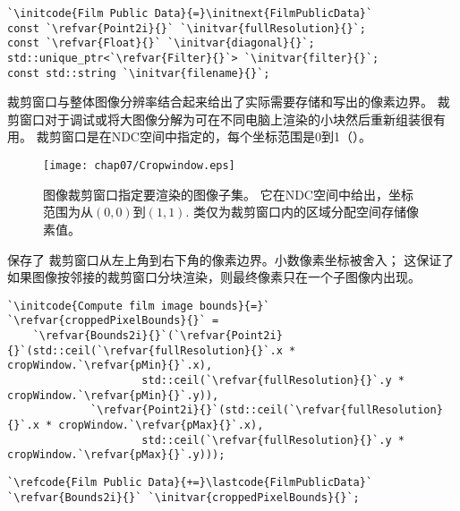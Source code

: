 \begin{lstlisting}
`\initcode{Film Public Data}{=}\initnext{FilmPublicData}`
const `\refvar{Point2i}{}` `\initvar{fullResolution}{}`;
const `\refvar{Float}{}` `\initvar{diagonal}{}`;
std::unique_ptr<`\refvar{Filter}{}`> `\initvar{filter}{}`;
const std::string `\initvar{filename}{}`;
\end{lstlisting}

裁剪窗口与整体图像分辨率结合起来给出了实际需要存储和写出的像素边界。
裁剪窗口对于调试或将大图像分解为可在不同电脑上渲染的小块然后重新组装很有用。
裁剪窗口是在NDC空间中指定的，每个坐标范围是0到1（）。
\begin{figure}[htbp]
    \centering\texttt{[image: chap07/Cropwindow.eps]}
    \caption{图像裁剪窗口指定要渲染的图像子集。
    它在NDC空间中给出，坐标范围为从$(0,0)$到$(1,1)$.
    类仅为裁剪窗口内的区域分配空间存储像素值。}
    \label{fig:7.47}
\end{figure}

保存了
裁剪窗口从左上角到右下角的像素边界。小数像素坐标被舍入；
这保证了如果图像按邻接的裁剪窗口分块渲染，则最终像素只在一个子图像内出现。
\begin{lstlisting}
`\initcode{Compute film image bounds}{=}`
`\refvar{croppedPixelBounds}{}` =
    `\refvar{Bounds2i}{}`(`\refvar{Point2i}{}`(std::ceil(`\refvar{fullResolution}{}`.x * cropWindow.`\refvar{pMin}{}`.x),
                     std::ceil(`\refvar{fullResolution}{}`.y * cropWindow.`\refvar{pMin}{}`.y)),
             `\refvar{Point2i}{}`(std::ceil(`\refvar{fullResolution}{}`.x * cropWindow.`\refvar{pMax}{}`.x),
                     std::ceil(`\refvar{fullResolution}{}`.y * cropWindow.`\refvar{pMax}{}`.y)));
\end{lstlisting}
\begin{lstlisting}
`\refcode{Film Public Data}{+=}\lastcode{FilmPublicData}`
`\refvar{Bounds2i}{}` `\initvar{croppedPixelBounds}{}`;
\end{lstlisting}

